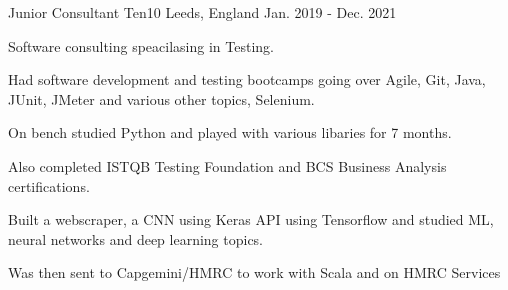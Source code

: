 \begin{cventries}
{    }
    \cventry
    {Junior Consultant} 
    {Ten10} 
    {Leeds, England} 
    {Jan. 2019 - Dec. 2021}
    {
      \raggedright
      \begin{cvitems}
        \item {Software consulting speacilasing in Testing.}
        \item {Had software development and testing bootcamps going over Agile, Git, Java, JUnit, JMeter and various other topics, Selenium.}
        \item {On bench studied Python and played with various libaries for 7 months.}
        \item {Also completed ISTQB Testing Foundation and BCS Business Analysis certifications.}
        \item {Built a webscraper, a CNN using Keras API using Tensorflow and studied ML, neural networks and deep learning topics.}
        \item {Was then sent to Capgemini/HMRC to work with Scala and on HMRC Services}
      \end{cvitems}
    }    

\end{cventries}
